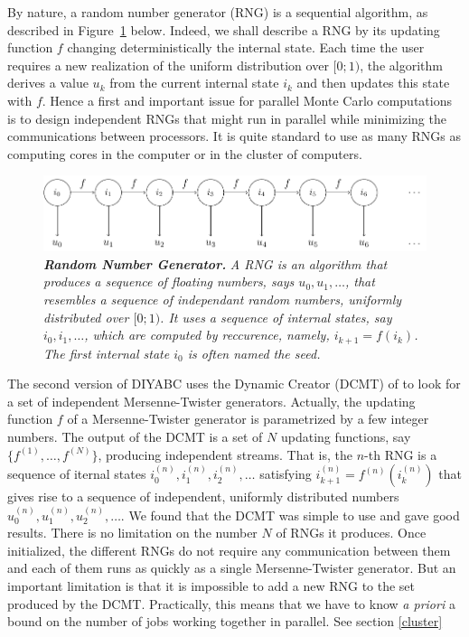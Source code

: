 By nature, a random number generator (RNG) is a sequential algorithm,
as described in Figure~\ref{fig:rng1} below. Indeed, we shall describe
a RNG by its updating function $f$ changing deterministically the
internal state. Each time the user requires a new realization of the
uniform distribution over $[0;1)$, the algorithm derives a value
$u_{k}$ from the current internal state $i_{k}$ and then updates
this state with $f$. Hence a first and important issue for parallel
Monte Carlo computations is to design independent RNGs that might
run in parallel while minimizing the communications between processors.
It is quite standard to use as many RNGs as computing cores in the
computer or in the cluster of computers.

\begin{figure}[htb]
\centering \textit{}%
\begin{minipage}[c]{0.6\linewidth}%
 \includegraphics[width=1\textwidth]{DCMT_rng} \caption[width=.6\textwidth]{\label{fig:rng1} \textbf{\textit{\footnotesize Random Number Generator.}}\textit{\footnotesize{}
A RNG is an algorithm that produces a sequence of floating numbers,
says $u_{0},u_{1},\ldots$, that resembles a sequence of independant
random numbers, uniformly distributed over $[0;1)$. It uses a sequence
of internal states, say $i_{0},i_{1},\ldots$, which are computed
by reccurence, namely, $i_{k+1}=f(i_{k})$. The first internal state
$i_{0}$ is often named the seed.}}
%
\end{minipage}
\end{figure}


The second version of DIYABC uses the Dynamic Creator (DCMT) of \citet{DCMT}
to look for a set of independent Mersenne-Twister generators. Actually,
the updating function $f$ of a Mersenne-Twister generator is parametrized
by a few integer numbers. The output of the DCMT is a set of $N$
updating functions, say $\{f^{(1)},\ldots,f^{(N)}\}$, producing independent
streams. That is, the $n$-th RNG is a sequence of iternal states
$i_{0}^{(n)},i_{1}^{(n)},i_{2}^{(n)},\ldots$ satisfying $i_{k+1}^{(n)}=f^{(n)}(i_{k}^{(n)})$
that gives rise to a sequence of independent, uniformly distributed
numbers $u_{0}^{(n)},u_{1}^{(n)},u_{2}^{(n)},\ldots$. We found that
the DCMT was simple to use and gave good results. There is no limitation
on the number $N$ of RNGs it produces. Once initialized, the different
RNGs do not require any communication between them and each of them
runs as quickly as a single Mersenne-Twister generator. But an important
limitation is that it is impossible to add a new RNG to the set produced
by the DCMT. Practically, this means that we have to know \textit{a
priori} a bound on the number of jobs working together in parallel.
See section \ref{cluster}


